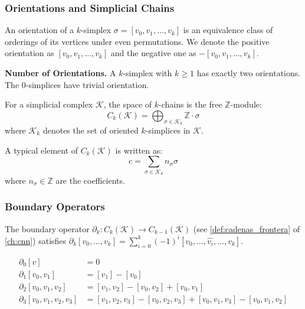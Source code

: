 \subsubsection{Orientations and Simplicial Chains}

\begin{definition}\label{def:orientacion_simplicio}
An orientation of a $k$-simplex $\sigma = [v_0, v_1, \ldots, v_k]$ is an equivalence class of orderings of its vertices under even permutations. We denote the positive orientation as $[v_0, v_1, \ldots, v_k]$ and the negative one as $-[v_0, v_1, \ldots, v_k]$.
\end{definition}

\textbf{Number of Orientations.}\label{rem:numero_orientaciones} A $k$-simplex with $k \geq 1$ has exactly two orientations. The 0-simplices have trivial orientation.

\begin{definition}\label{def:espacio_cadenas}
For a simplicial complex $\mathcal{K}$, the space of $k$-chains is the free $\mathbb{Z}$-module:
\begin{equation}
    C_k(\mathcal{K}) = \bigoplus_{\sigma \in \mathcal{K}_k} \mathbb{Z} \cdot \sigma
\end{equation}
where $\mathcal{K}_k$ denotes the set of oriented $k$-simplices in $\mathcal{K}$.
\end{definition}

A typical element of $C_k(\mathcal{K})$ is written as:
\begin{equation}
    c = \sum_{\sigma \in \mathcal{K}_k} n_{\sigma} \sigma
\end{equation}
where $n_{\sigma} \in \mathbb{Z}$ are the coefficients.

\subsubsection{Boundary Operators}

The boundary operator $\partial_k: C_k(\mathcal{K}) \to C_{k-1}(\mathcal{K})$ (see \autoref{def:cadenas_frontera} of \autoref{ch:cnn}) satisfies $\partial_k[v_0, \ldots, v_k] = \sum_{i=0}^k (-1)^i [v_0, \ldots, \hat{v_i}, \ldots, v_k]$.\label{def:operador_frontera}

\begin{example}\label{ex:operadores_frontera_explicitos}
\begin{align}
    \partial_0[v] &= 0 \\
    \partial_1[v_0, v_1] &= [v_1] - [v_0] \\
    \partial_2[v_0, v_1, v_2] &= [v_1, v_2] - [v_0, v_2] + [v_0, v_1] \\
    \partial_3[v_0, v_1, v_2, v_3] &= [v_1, v_2, v_3] - [v_0, v_2, v_3] + [v_0, v_1, v_3] - [v_0, v_1, v_2]
\end{align}
\end{example}

